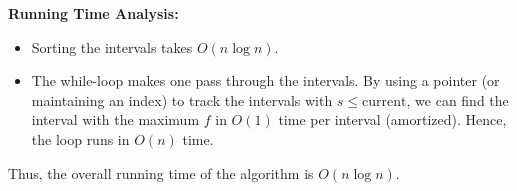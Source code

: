 \documentclass[11pt]{article}
\begin{document}
    \medskip
    \noindent\textbf{Running Time Analysis:}
    
    \begin{itemize}
        \item Sorting the intervals takes \(O(n \log n)\).
        \item The while-loop makes one pass through the intervals. By using a pointer (or maintaining an index) to track the intervals with \(s \le \text{current}\), we can find the interval with the maximum \(f\) in \(O(1)\) time per interval (amortized). Hence, the loop runs in \(O(n)\) time.
    \end{itemize}
    
    Thus, the overall running time of the algorithm is \(O(n \log n)\).

    
    \newpage
\end{document}
